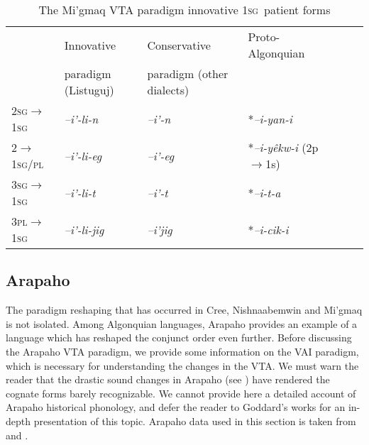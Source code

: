 \documentclass[twoside,a4paper,11pt]{article}
\newcommand{\ipa}[1]{{\phon\textit{#1}}}
\newcommand{\sg}{\textsc{sg}}
\newcommand{\pl}{\textsc{pl}}
\newcommand{\grise}[1]{\cellcolor{lightgray}\textbf{#1}}
\newcommand{\Σ}{\greek{Σ}}
\begin{document}
\begin{table}[H]
\caption{The Mi'gmaq VTA paradigm innovative 1\sg\ patient forms}
\centering \label{tab:migmaq.vta.innov.1s}
\begin{tabular}{lllllll}
\toprule
& Innovative & Conservative & Proto-Algonquian \\
&paradigm (Listuguj) & paradigm (other dialects) &\\
\midrule
2\sg$\rightarrow$1\sg &\ipa{--i'-li-n} \grise{}& 	\ipa{--i'-n} & *\ipa{--i-yan-i}\\
2$\rightarrow$1\sg/\pl &\ipa{--i'-li-eg} \grise{}& 	\ipa{--i'-eg} & *\ipa{--i-yêkw-i} (2p$\rightarrow$1s)\\
\midrule
3\sg$\rightarrow$1\sg & 	\ipa{--i'-li-t} \grise{}& 	\ipa{--i'-t} &  *\ipa{--i-t-a} \\
3\pl$\rightarrow$1\sg & 	\ipa{--i'-li-jig} \grise{}& 	\ipa{--i'jig}  &*\ipa{--i-cik-i} \\
\bottomrule
\end{tabular}
\end{table}


\subsection{Arapaho}

The paradigm reshaping that has occurred in Cree, Nishnaabemwin and Mi'gmaq is not isolated. Among Algonquian languages, Arapaho provides an example of a language which has reshaped the conjunct order even further. Before discussing the Arapaho VTA paradigm, we provide some information on the VAI   paradigm, which is necessary for understanding the changes in the VTA. %
We must warn the reader that the drastic sound changes in Arapaho (see \citealt{goddard74arapaho}) have rendered the cognate forms barely recognizable. We cannot provide here a detailed account of Arapaho historical phonology, and defer the reader to Goddard's works for an in-depth presentation of this topic. Arapaho data used in this section is taken from \citet{salzmann67arapaho.verb} and \citet{cowell06arapaho}.
\end{document}
